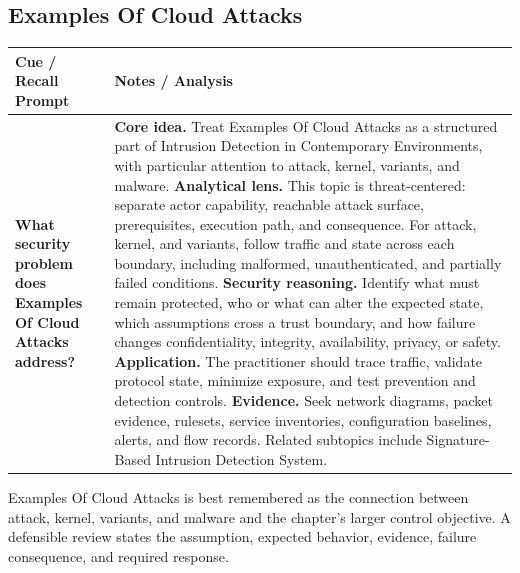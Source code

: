 \documentclass[11pt]{article}
\newcommand{\CornellHeader}{%
\rowcolor{Navy}\color{white}\bfseries Cue / Recall Prompt & \color{white}\bfseries Notes / Analysis\\\hline}
\newcommand{\CornellRow}[2]{%
\cellcolor{CueGray}\RaggedRight\textbf{#1} & \RaggedRight #2\\\hline}
\begin{document}
\subsection*{Examples Of Cloud Attacks}
\begin{longtable}{>{\RaggedRight\arraybackslash}p{}|>{\RaggedRight\arraybackslash}p{}}
\CornellHeader
\CornellRow{What security problem does Examples Of Cloud Attacks address?}{\textbf{Core idea.} Treat Examples Of Cloud Attacks as a structured part of Intrusion Detection in Contemporary Environments, with particular attention to attack, kernel, variants, and malware. \textbf{Analytical lens.} This topic is threat-centered: separate actor capability, reachable attack surface, prerequisites, execution path, and consequence. For attack, kernel, and variants, follow traffic and state across each boundary, including malformed, unauthenticated, and partially failed conditions. \textbf{Security reasoning.} Identify what must remain protected, who or what can alter the expected state, which assumptions cross a trust boundary, and how failure changes confidentiality, integrity, availability, privacy, or safety. \textbf{Application.} The practitioner should trace traffic, validate protocol state, minimize exposure, and test prevention and detection controls. \textbf{Evidence.} Seek network diagrams, packet evidence, rulesets, service inventories, configuration baselines, alerts, and flow records. Related subtopics include Signature-Based Intrusion Detection System.}
\end{longtable}
\begin{topicsummary}
Examples Of Cloud Attacks is best remembered as the connection between attack, kernel, variants, and malware and the chapter's larger control objective. A defensible review states the assumption, expected behavior, evidence, failure consequence, and required response.
\end{topicsummary}
\end{document}
